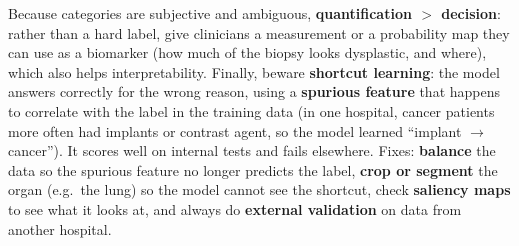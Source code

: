 \documentclass[a4paper]{article}
\newcommand{\K}[1]{\textcolor{kg}{\textbf{#1}}}
\newcommand{\E}[1]{\textcolor{ep}{#1}}
\newcommand{\ra}{\ensuremath{\to}}
\begin{document}
Because categories are subjective and ambiguous, \K{quantification $>$ decision}: rather than a hard label, give clinicians a measurement or a probability map they can use as a biomarker (\E{how much of the biopsy looks dysplastic, and where}), which also helps interpretability. Finally, beware \K{shortcut learning}: the model answers correctly for the wrong reason, using a \K{spurious feature} that happens to correlate with the label in the training data (\E{in one hospital, cancer patients more often had implants or contrast agent, so the model learned ``implant \ra{} cancer''}). It scores well on internal tests and fails elsewhere. Fixes: \K{balance} the data so the spurious feature no longer predicts the label, \K{crop or segment} the organ (e.g.\ the lung) so the model cannot see the shortcut, check \K{saliency maps} to see what it looks at, and always do \K{external validation} on data from another hospital.
\end{document}
